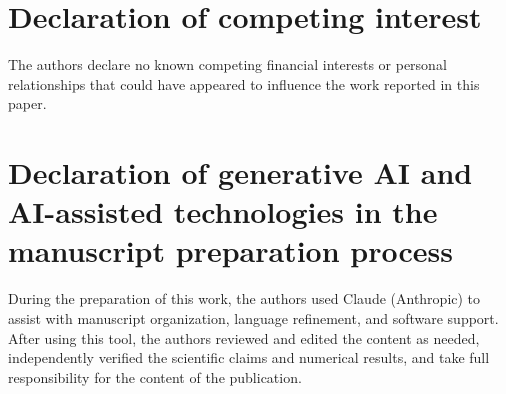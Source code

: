 \documentclass[a4paper,fleqn]{cas-sc}
\begin{document}
\printcredits

\section*{Declaration of competing interest}
The authors declare no known competing financial interests or personal
relationships that could have appeared to influence the work reported in
this paper.

\section*{Declaration of generative AI and AI-assisted technologies in the manuscript preparation process}
During the preparation of this work, the authors used Claude (Anthropic) to
assist with manuscript organization, language refinement, and software
support. After using this tool, the authors reviewed and edited the content
as needed, independently verified the scientific claims and numerical
results, and take full responsibility for the content of the publication.
\end{document}
